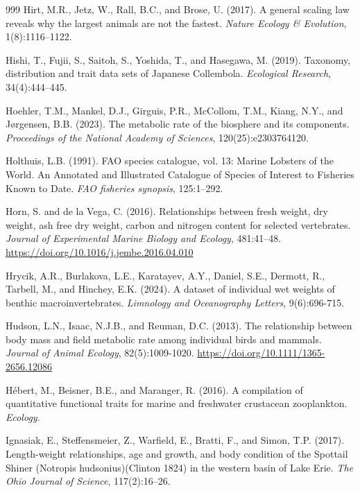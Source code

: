 \begin{thebibliography}{999}
Hirt, M.R., Jetz, W., Rall, B.C., and Brose, U. (2017). A general scaling law reveals why the largest animals are not the fastest. \textit{Nature Ecology \& Evolution}, 1(8):1116--1122.

Hishi, T., Fujii, S., Saitoh, S., Yoshida, T., and Hasegawa, M. (2019). Taxonomy, distribution and trait data sets of Japanese Collembola. \textit{Ecological Research}, 34(4):444--445.

Hoehler, T.M., Mankel, D.J., Girguis, P.R., McCollom, T.M., Kiang, N.Y., and J{\o}rgensen, B.B. (2023). The metabolic rate of the biosphere and its components. \textit{Proceedings of the National Academy of Sciences}, 120(25):e2303764120.

Holthuis, L.B. (1991). FAO species catalogue, vol. 13: Marine Lobsters of the World. An Annotated and Illustrated Catalogue of Species of Interest to Fisheries Known to Date. \textit{FAO fisheries synopsis}, 125:1--292.

Horn, S. and de la Vega, C. (2016). Relationships between fresh weight, dry weight, ash free dry weight, carbon and nitrogen content for selected vertebrates. \textit{Journal of Experimental Marine Biology and Ecology}, 481:41--48. \url{https://doi.org/10.1016/j.jembe.2016.04.010}

Hrycik, A.R., Burlakova, L.E., Karatayev, A.Y., Daniel, S.E., Dermott, R., Tarbell, M., and Hinchey, E.K. (2024). A dataset of individual wet weights of benthic macroinvertebrates. \textit{Limnology and Oceanography Letters}, 9(6):696-715.

Hudson, L.N., Isaac, N.J.B., and Reuman, D.C. (2013). The relationship between body mass and field metabolic rate among individual birds and mammals. \textit{Journal of Animal Ecology}, 82(5):1009-1020. \url{https://doi.org/10.1111/1365-2656.12086}

H{\'e}bert, M., Beisner, B.E., and Maranger, R. (2016). A compilation of quantitative functional traits for marine and freshwater crustacean zooplankton. \textit{Ecology}.

Ignasiak, E., Steffensmeier, Z., Warfield, E., Bratti, F., and Simon, T.P. (2017). Length-weight relationships, age and growth, and body condition of the Spottail Shiner (Notropis hudsonius)(Clinton 1824) in the western basin of Lake Erie. \textit{The Ohio Journal of Science}, 117(2):16--26.


\end{thebibliography}
